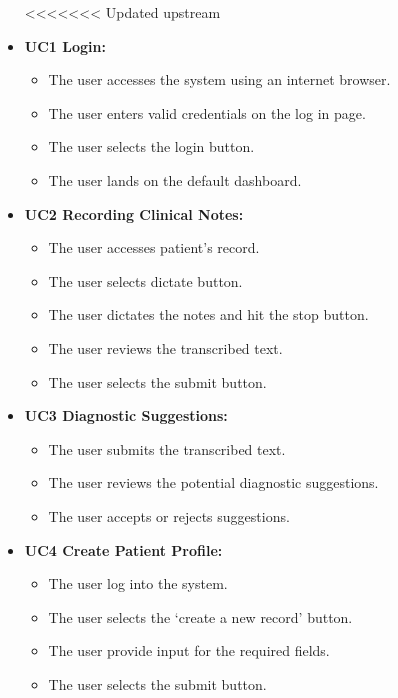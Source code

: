 \documentclass[12pt]{article}
\begin{document}
\begin{itemize}
<<<<<<< Updated upstream
  \item\textbf{UC1 Login:}
  \begin{itemize}
    \item The user accesses the system using an internet browser.
    \item The user enters valid credentials on the log in page.
    \item The user selects the login button.
    \item The user lands on the default dashboard.
  \end{itemize}
  \item\textbf{UC2 Recording Clinical Notes:}
  \begin{itemize}
    \item The user accesses patient’s record.
    \item The user selects dictate button.
    \item The user dictates the notes and hit the stop button.
    \item The user reviews the transcribed text.
    \item The user selects the submit button.
  \end{itemize}
  \item\textbf{UC3 Diagnostic Suggestions:}
  \begin{itemize}
    \item The user submits the transcribed text.
    \item The user reviews the potential diagnostic suggestions.
    \item The user accepts or rejects suggestions.
  \end{itemize}
  \item\textbf{UC4 Create Patient Profile:}
  \begin{itemize}
    \item The user log into the system.
    \item The user selects the ‘create a new record’ button.
    \item The user provide input for the required fields.    
    \item The user selects the submit button.
  \end{itemize}
\end{itemize}
\end{document}
